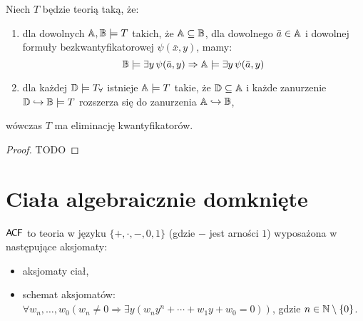 \documentclass{article}
\begin{document}
\begin{tw}
	\label{tw:qe}
	Niech $T$ będzie teorią taką, że:
	\begin{enumerate}
		\item dla dowolnych $\mathbb{A}, \mathbb{B} \models T$ takich, że $\mathbb{A} \subseteq \mathbb{B}$, dla dowolnego $\bar{a} \in \mathbb{A}$ i dowolnej formuły bezkwantyfikatorowej $\psi(\bar{x}, y)$, mamy:
			\[
				\mathbb{B} \models \exists y \, \psi(\bar{a}, y) \Rightarrow \mathbb{A} \models \exists y \, \psi(\bar{a}, y)
			\]
		\item dla każdej $\mathbb{D} \models T_{\forall}$ istnieje $\mathbb{A} \models T$ takie, że $\mathbb{D} \subseteq \mathbb{A}$ i każde zanurzenie $\mathbb{D} \hookrightarrow \mathbb{B} \models T$ rozszerza się do zanurzenia $\mathbb{A} \hookrightarrow \mathbb{B}$,
	\end{enumerate}
	wówczas $T$ ma eliminację kwantyfikatorów.
\end{tw}
\begin{proof}
	\color{red} TODO
\end{proof}



\section{Ciała algebraicznie domknięte}

\begin{df}
	$\mathsf{A \mkern-2.0mu C \mkern-1.1mu F}$ to teoria w języku $\{+, \cdot, -, 0, 1\}$ (gdzie $-$ jest arności $1$) wyposażona w następujące aksjomaty:
	\begin{itemize}
		\item aksjomaty ciał,
		\item schemat aksjomatów: $\forall w_n, \ldots, w_0 (w_n \neq 0 \Rightarrow \exists y (w_n y^n + \cdots + w_1y + w_0 = 0))$, gdzie $n \in \mathbb{N} \setminus \{0\}$.
	\end{itemize}
\end{df}
\end{document}
